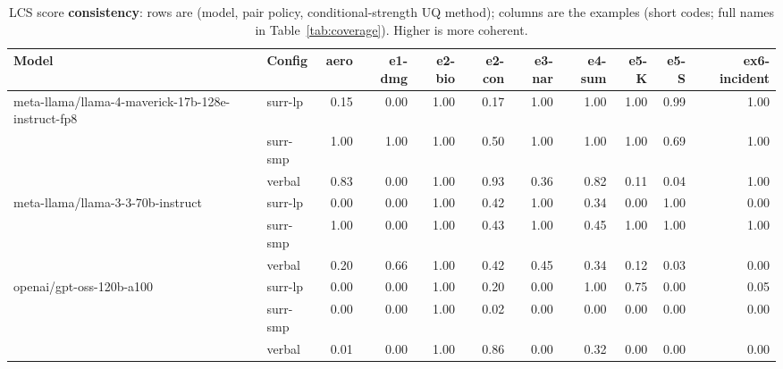 \documentclass[11pt]{article}
\begin{document}
\begin{table}[htbp]
\centering
\footnotesize
\setlength{\tabcolsep}{3.5pt}
\caption{LCS score \textbf{consistency}: rows are (model, pair policy, conditional-strength UQ method); columns are the examples (short codes; full names in Table~\ref{tab:coverage}). Higher is more coherent.}
\label{tab:consistency}
\begin{tabular}{llrrrrrrrrr}
\toprule
\textbf{Model} & \textbf{Config} & \textbf{aero} & \textbf{e1-dmg} & \textbf{e2-bio} & \textbf{e2-con} & \textbf{e3-nar} & \textbf{e4-sum} & \textbf{e5-K} & \textbf{e5-S} & \textbf{ex6-incident} \\
\midrule
meta-llama/llama-4-maverick-17b-128e-instruct-fp8 & surr-lp & 0.15 & 0.00 & 1.00 & 0.17 & 1.00 & 1.00 & 1.00 & 0.99 & 1.00 \\
 & surr-smp & 1.00 & 1.00 & 1.00 & 0.50 & 1.00 & 1.00 & 1.00 & 0.69 & 1.00 \\
 & verbal & 0.83 & 0.00 & 1.00 & 0.93 & 0.36 & 0.82 & 0.11 & 0.04 & 1.00 \\
\midrule
meta-llama/llama-3-3-70b-instruct & surr-lp & 0.00 & 0.00 & 1.00 & 0.42 & 1.00 & 0.34 & 0.00 & 1.00 & 0.00 \\
 & surr-smp & 1.00 & 0.00 & 1.00 & 0.43 & 1.00 & 0.45 & 1.00 & 1.00 & 1.00 \\
 & verbal & 0.20 & 0.66 & 1.00 & 0.42 & 0.45 & 0.34 & 0.12 & 0.03 & 0.00 \\
\midrule
openai/gpt-oss-120b-a100 & surr-lp & 0.00 & 0.00 & 1.00 & 0.20 & 0.00 & 1.00 & 0.75 & 0.00 & 0.05 \\
 & surr-smp & 0.00 & 0.00 & 1.00 & 0.02 & 0.00 & 0.00 & 0.00 & 0.00 & 0.00 \\
 & verbal & 0.01 & 0.00 & 1.00 & 0.86 & 0.00 & 0.32 & 0.00 & 0.00 & 0.00 \\
\bottomrule
\end{tabular}
\end{table}
\end{document}
